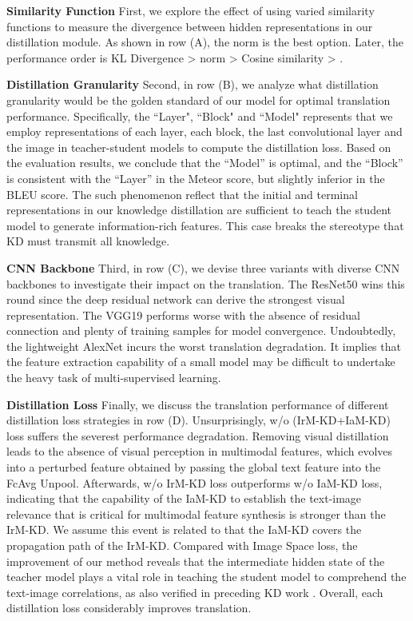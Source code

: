 \documentclass[11pt]{article}
\begin{document}
\textbf{Similarity Function}
First, we explore the effect of using varied similarity functions to measure the divergence between hidden representations in our distillation module.
As shown in row (A), the  norm is the best option.
Later, the performance order is KL Divergence \cite{kullback1951information} >  norm > Cosine similarity > .

\textbf{Distillation Granularity}
Second, in row (B), we analyze what distillation granularity would be the golden standard of our model for optimal translation performance.
Specifically, the ``Layer", ``Block" and ``Model" represents that we employ representations of each layer, each block, the last convolutional layer and the image in teacher-student models to compute the distillation loss.
Based on the evaluation results, we conclude that the ``Model'' is optimal, and the ``Block'' is consistent with the ``Layer'' in the Meteor score, but slightly inferior in the BLEU score.
The such phenomenon reflect that the initial and terminal representations in our knowledge distillation are sufficient to teach the student model to generate information-rich features. This case breaks the stereotype that KD must transmit all knowledge.

\textbf{CNN Backbone}
Third, in row (C), we devise three variants with diverse CNN backbones to investigate their impact on the translation.
The ResNet50 wins this round since the deep residual network can derive the strongest visual representation.
The VGG19 performs worse with the absence of residual connection and plenty of training samples for model convergence.
Undoubtedly, the lightweight AlexNet incurs the worst translation degradation.
It implies that the feature extraction capability of a small model may be difficult to undertake the heavy task of multi-supervised learning.

\textbf{Distillation Loss}
Finally, we discuss the translation performance of different distillation loss strategies in row (D).
Unsurprisingly, w/o (IrM-KD+IaM-KD) loss suffers the severest performance degradation.
Removing visual distillation leads to the absence of visual perception in multimodal features, which evolves into a perturbed feature obtained by passing the global text feature into the FcAvg Unpool.
Afterwards, w/o IrM-KD loss outperforms w/o IaM-KD loss, indicating that the capability of the IaM-KD to establish the text-image relevance that is critical for multimodal feature synthesis is stronger than the IrM-KD.
We assume this event is related to that the IaM-KD covers the propagation path of the IrM-KD.
Compared with Image Space loss, the improvement of our method reveals that the intermediate hidden state of the teacher model plays a vital role in teaching the student model to comprehend the text-image correlations, as also verified in preceding KD work \cite{romero2014fitnets,yim2017gift}.
Overall, each distillation loss considerably improves translation.
\end{document}
